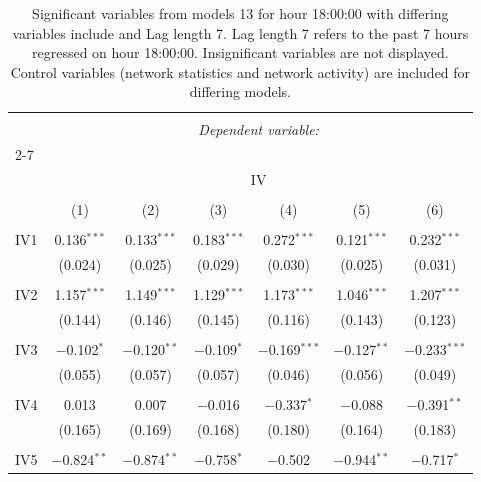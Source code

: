 
\begin{table}[!htbp] \centering 
  \caption{Significant variables from models 13 for hour 18:00:00 with differing variables include 
                               and Lag length 7. Lag length 7 refers to the past 7 hours regressed on hour 18:00:00. 
                               Insignificant variables are not displayed. 
                               Control variables (network statistics and network activity) are 
                               included for differing models.} 
  \label{IVmodels1_t_hourlagged5} 
\scriptsize 
\begin{tabular}{@{\extracolsep{5pt}}lcccccc} 
\\[-1.8ex]\hline 
\hline \\[-1.8ex] 
 & \multicolumn{6}{c}{\textit{Dependent variable:}} \\ 
\cline{2-7} 
\\[-1.8ex] & \multicolumn{6}{c}{IV} \\ 
\\[-1.8ex] & (1) & (2) & (3) & (4) & (5) & (6)\\ 
\hline \\[-1.8ex] 
 IV1 & 0.136$^{***}$ & 0.133$^{***}$ & 0.183$^{***}$ & 0.272$^{***}$ & 0.121$^{***}$ & 0.232$^{***}$ \\ 
  & (0.024) & (0.025) & (0.029) & (0.030) & (0.025) & (0.031) \\ 
  & & & & & & \\ 
 IV2 & 1.157$^{***}$ & 1.149$^{***}$ & 1.129$^{***}$ & 1.173$^{***}$ & 1.046$^{***}$ & 1.207$^{***}$ \\ 
  & (0.144) & (0.146) & (0.145) & (0.116) & (0.143) & (0.123) \\ 
  & & & & & & \\ 
 IV3 & $-$0.102$^{*}$ & $-$0.120$^{**}$ & $-$0.109$^{*}$ & $-$0.169$^{***}$ & $-$0.127$^{**}$ & $-$0.233$^{***}$ \\ 
  & (0.055) & (0.057) & (0.057) & (0.046) & (0.056) & (0.049) \\ 
  & & & & & & \\ 
 IV4 & 0.013 & 0.007 & $-$0.016 & $-$0.337$^{*}$ & $-$0.088 & $-$0.391$^{**}$ \\ 
  & (0.165) & (0.169) & (0.168) & (0.180) & (0.164) & (0.183) \\ 
  & & & & & & \\ 
 IV5 & $-$0.824$^{**}$ & $-$0.874$^{**}$ & $-$0.758$^{*}$ & $-$0.502 & $-$0.944$^{**}$ & $-$0.717$^{*}$ \\ 

\end{tabular}
\end{table}

